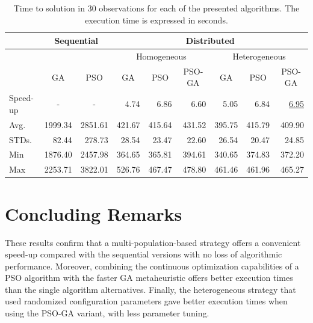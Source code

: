 \documentclass[runningheads]{llncs}
\begin{document}
\begin{table}[]
\caption{
  Time to solution in 30 observations for each of the
    presented algorithms. The execution time is expressed in seconds.
    }\label{tab:speedup}
\renewcommand*{\arraystretch}{1.4}
\setlength{\tabcolsep}{5pt}
    \begin{small}
\begin{tabular}{lrrrrrrrr}
    \hline
				&  \multicolumn{2}{c}{Sequential} & \multicolumn{6}{c}{Distributed} \\
    \hline
    & &    & \multicolumn{3}{c}{Homogeneous} & \multicolumn{3}{c}{Heterogeneous} \\
    \cline{4-6} \cline{7-9}
       & \multicolumn{1}{c}{GA} & \multicolumn{1}{c}{PSO} &\multicolumn{1}{c}{GA} & \multicolumn{1}{c}{PSO} & \multicolumn{1}{c}{PSO-GA} &\multicolumn{1}{c}{GA} & \multicolumn{1}{c}{PSO} & \multicolumn{1}{c}{PSO-GA}\\
    \hline
    Speed-up & \multicolumn{1}{c}{-} & \multicolumn{1}{c}{-} & 4.74 & 6.86 & 6.60 & 5.05 & 6.84 & \underline{6.95} \\
    \hline
Avg.   & 1999.34 & 2851.61 & 421.67 & 415.64 & 431.52 & 395.75 & 415.79 & 409.90 \\
    \hline
STDs.   & 82.44   & 278.73  & 28.54           & 23.47                    & 22.60           & 26.54           & 20.47           & 24.85    \\
    \hline
Min    & 1876.40 & 2457.98 & 364.65          & 365.81                   & 394.61          & 340.65          & 374.83          & 372.20   \\
    \hline
Max    & 2253.71 & 3822.01 & 526.76          & 467.47                   & 478.80          & 461.46          & 461.96          & 465.27  \\
    \hline
\end{tabular}
    \end{small}
\end{table}

\section{Concluding Remarks}

These results confirm that a multi-population-based strategy offers a convenient
speed-up compared with the sequential versions with no loss of algorithmic
performance.  Moreover, combining the continuous optimization capabilities of a
PSO algorithm with the faster GA metaheuristic offers better execution times
than the single algorithm alternatives.  Finally, the heterogeneous strategy
that used randomized configuration parameters gave better execution times when
using the PSO-GA variant, with less parameter tuning.

%
%
%
%


%
\end{document}
